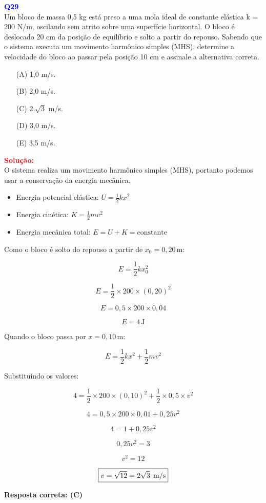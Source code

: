 \documentclass[a4paper,12pt]{article}
\begin{document}
\begin{flushleft}
\textbf{\textcolor{blue}{\Large Q29}}\\

Um bloco de massa 0,5 kg está preso a uma mola
ideal de constante elástica k = 200 N/m, oscilando
sem atrito sobre uma superfície horizontal. O
bloco é deslocado 20 cm da posição de equilíbrio
e solto a partir do repouso. Sabendo que o
sistema executa um movimento harmônico
simples (MHS), determine a velocidade do bloco
ao passar pela posição 10 cm e assinale a
alternativa correta.

\begin{itemize}
\item[(A)] 1,0 m/s.
\item[(B)] 2,0 m/s.
\item[(C)] 2.$\sqrt{3}$ m/s.
\item[(D)] 3,0 m/s.
\item[(E)] 3,5 m/s.
\end{itemize}

\vspace{0.5cm}

\textcolor{red}{\textbf{Solução:}}\\

O sistema realiza um movimento harmônico simples (MHS), portanto podemos usar a conservação da energia mecânica.

\begin{itemize}
\item Energia potencial elástica: $U = \frac{1}{2} k x^2$
\item Energia cinética: $K = \frac{1}{2} m v^2$
\item Energia mecânica total: $E = U + K = \text{constante}$
\end{itemize}

Como o bloco é solto do repouso a partir de $x_0 = 0,20\, \text{m}$:

\[
E = \frac{1}{2} k x_0^2
\]

\[
E = \frac{1}{2} \times 200 \times (0,20)^2
\]

\[
E = 0,5 \times 200 \times 0,04
\]

\[
E = 4\, \text{J}
\]

Quando o bloco passa por $x = 0,10\, \text{m}$:

\[
E = \frac{1}{2} k x^2 + \frac{1}{2} m v^2
\]

Substituindo os valores:

\[
4 = \frac{1}{2} \times 200 \times (0,10)^2 + \frac{1}{2} \times 0,5 \times v^2
\]

\[
4 = 0,5 \times 200 \times 0,01 + 0,25 v^2
\]

\[
4 = 1 + 0,25 v^2
\]

\[
0,25 v^2 = 3
\]

\[
v^2 = 12
\]

\[
\boxed{v = \sqrt{12} = 2\sqrt{3} \hspace{0.15cm} \text{m/s}}
\]


\textbf{Resposta correta: \colorbox{green!50}{(C)}}

\end{flushleft}
\end{document}
